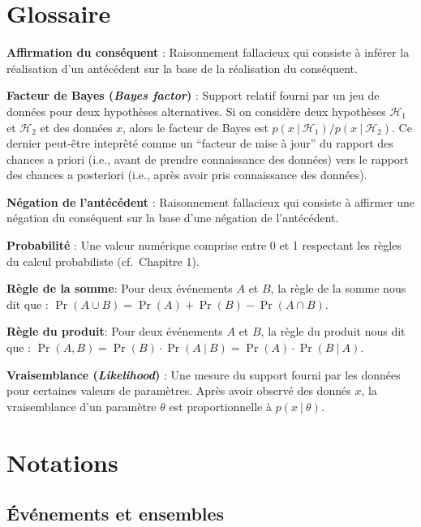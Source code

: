 \documentclass[
  a4paper,11pt,twoside,onecolumn,openright,final,oldfontcommands]{memoir}
\theoremstyle{definition}
\theoremstyle{definition}
\theoremstyle{definition}
\theoremstyle{definition}
\theoremstyle{remark}
\begin{document}
\hypertarget{appendix-annexes}{%
\appendix}


\hypertarget{glossaire}{%
\chapter{Glossaire}\label{glossaire}}

\textbf{Affirmation du conséquent} : Raisonnement fallacieux qui consiste à inférer la réalisation d'un antécédent sur la base de la réalisation du conséquent.

\textbf{Facteur de Bayes (\emph{Bayes factor})} : Support relatif fourni par un jeu de données pour deux hypothèses alternatives. Si on considère deux hypothèses \(\mathcal{H}_{1}\) et \(\mathcal{H}_{2}\) et des données \(x\), alors le facteur de Bayes est \(p(x \ | \ \mathcal{H}_{1}) / p(x \ | \ \mathcal{H}_{2})\). Ce dernier peut-être inteprêté comme un ``facteur de mise à jour'' du rapport des chances a priori (i.e., avant de prendre connaissance des données) vers le rapport des chances a posteriori (i.e., après avoir pris connaissance des données).

\textbf{Négation de l'antécédent} : Raisonnement fallacieux qui consiste à affirmer une négation du conséquent sur la base d'une négation de l'antécédent.

\textbf{Probabilité} : Une valeur numérique comprise entre 0 et 1 respectant les règles du calcul probabiliste (cf.~Chapitre 1).

\textbf{Règle de la somme}: Pour deux événements \(A\) et \(B\), la règle de la somme nous dit que : \(\Pr(A \cup B) = \Pr(A) + \Pr(B) - \Pr(A \cap B)\).

\textbf{Règle du produit}: Pour deux événements \(A\) et \(B\), la règle du produit nous dit que : \(\Pr(A, B) = \Pr(B) \cdot \Pr(A \ | \ B) = \Pr(A) \cdot \Pr(B \ | \ A)\).

\textbf{Vraisemblance (\emph{Likelihood})} : Une mesure du support fourni par les données pour certaines valeurs de paramètres. Après avoir observé des donnés \(x\), la vraisemblance d'un paramètre \(\theta\) est proportionnelle à \(p(x \ | \ \theta)\).

\hypertarget{notations}{%
\chapter{Notations}\label{notations}}

\hypertarget{uxe9vuxe9nements-et-ensembles}{%
\section*{Événements et ensembles}\label{uxe9vuxe9nements-et-ensembles}}
\end{document}
